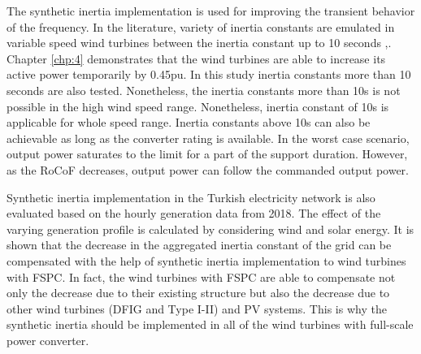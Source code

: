The synthetic inertia implementation is used for improving the transient behavior of the frequency. In the literature, variety of inertia constants are emulated in variable speed wind turbines between the inertia constant up to 10 seconds \cite{Gonzalez-Longatt2013},\cite{Gonzalez-Longatt}. Chapter \ref{chp:4} demonstrates that the wind turbines are able to increase its active power temporarily by 0.45pu. In this study inertia constants more than 10 seconds are also tested. Nonetheless, the inertia constants more than 10s is not possible in the high wind speed range. Nonetheless, inertia constant of 10s is applicable for whole speed range. Inertia constants above 10s can also be achievable as long as the converter rating is available. In the worst case scenario, output power saturates to the limit for a part of the support duration. However, as the RoCoF decreases, output power can follow the commanded output power.\par 
Synthetic inertia implementation in the Turkish electricity network is also evaluated based on the hourly generation data from 2018. The effect of the varying generation profile is calculated by considering wind and solar energy. It is shown that the decrease in the aggregated inertia constant of the grid can be compensated with the help of synthetic inertia implementation to wind turbines with FSPC. In fact, the wind turbines with FSPC are able to compensate not only the decrease due to their existing structure but also the decrease due to other wind turbines (DFIG and Type I-II) and PV systems. This is why the synthetic inertia should be implemented in all of the wind turbines with full-scale power converter.
